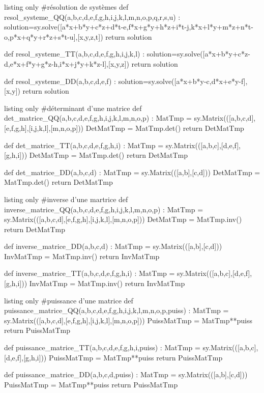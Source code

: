 \documentclass[french,a4paper,11pt]{article}
\begin{document}
\begin{PresentationCodePython}{listing only}
#résolution de systèmes
def resol_systeme_QQ(a,b,c,d,e,f,g,h,i,j,k,l,m,n,o,p,q,r,s,u) :
	solution=sy.solve([a*x+b*y+c*z+d*t-e,f*x+g*y+h*z+i*t-j,k*x+l*y+m*z+n*t-o,p*x+q*y+r*z+s*t-u],[x,y,z,t])
	return solution

def resol_systeme_TT(a,b,c,d,e,f,g,h,i,j,k,l) :
	solution=sy.solve([a*x+b*y+c*z-d,e*x+f*y+g*z-h,i*x+j*y+k*z-l],[x,y,z])
	return solution

def resol_systeme_DD(a,b,c,d,e,f) :
	solution=sy.solve([a*x+b*y-c,d*x+e*y-f],[x,y])
	return solution
\end{PresentationCodePython}

\begin{PresentationCodePython}{listing only}
#déterminant d'une matrice
def det_matrice_QQ(a,b,c,d,e,f,g,h,i,j,k,l,m,n,o,p) :
	MatTmp = sy.Matrix(([a,b,c,d],[e,f,g,h],[i,j,k,l],[m,n,o,p]))
	DetMatTmp = MatTmp.det()
	return DetMatTmp

def det_matrice_TT(a,b,c,d,e,f,g,h,i) :
	MatTmp = sy.Matrix(([a,b,c],[d,e,f],[g,h,i]))
	DetMatTmp = MatTmp.det()
	return DetMatTmp

def det_matrice_DD(a,b,c,d) :
	MatTmp = sy.Matrix(([a,b],[c,d]))
	DetMatTmp = MatTmp.det()
	return DetMatTmp
\end{PresentationCodePython}

\begin{PresentationCodePython}{listing only}
#inverse d'une martrice
def inverse_matrice_QQ(a,b,c,d,e,f,g,h,i,j,k,l,m,n,o,p) :
	MatTmp = sy.Matrix(([a,b,c,d],[e,f,g,h],[i,j,k,l],[m,n,o,p]))
	DetMatTmp = MatTmp.inv()
	return DetMatTmp

def inverse_matrice_DD(a,b,c,d) :
	MatTmp = sy.Matrix(([a,b],[c,d]))
	InvMatTmp = MatTmp.inv()
	return InvMatTmp

def inverse_matrice_TT(a,b,c,d,e,f,g,h,i) :
	MatTmp = sy.Matrix(([a,b,c],[d,e,f],[g,h,i]))
	InvMatTmp = MatTmp.inv()
	return InvMatTmp
\end{PresentationCodePython}

\begin{PresentationCodePython}{listing only}
#puissance d'une matrice
def puissance_matrice_QQ(a,b,c,d,e,f,g,h,i,j,k,l,m,n,o,p,puiss) :
	MatTmp = sy.Matrix(([a,b,c,d],[e,f,g,h],[i,j,k,l],[m,n,o,p]))
	PuissMatTmp = MatTmp**puiss
	return PuissMatTmp

def puissance_matrice_TT(a,b,c,d,e,f,g,h,i,puiss) :
	MatTmp = sy.Matrix(([a,b,c],[d,e,f],[g,h,i]))
	PuissMatTmp = MatTmp**puiss
	return PuissMatTmp

def puissance_matrice_DD(a,b,c,d,puiss) :
	MatTmp = sy.Matrix(([a,b],[c,d]))
	PuissMatTmp = MatTmp**puiss
	return PuissMatTmp
\end{PresentationCodePython}
\end{document}

